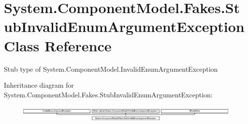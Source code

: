\hypertarget{class_system_1_1_component_model_1_1_fakes_1_1_stub_invalid_enum_argument_exception}{\section{System.\-Component\-Model.\-Fakes.\-Stub\-Invalid\-Enum\-Argument\-Exception Class Reference}
\label{class_system_1_1_component_model_1_1_fakes_1_1_stub_invalid_enum_argument_exception}
}


Stub type of System.\-Component\-Model.\-Invalid\-Enum\-Argument\-Exception 


Inheritance diagram for System.\-Component\-Model.\-Fakes.\-Stub\-Invalid\-Enum\-Argument\-Exception\-:\begin{figure}[H]
\begin{center}
\leavevmode
\includegraphics[height=0.862202cm]{class_system_1_1_component_model_1_1_fakes_1_1_stub_invalid_enum_argument_exception}
\end{center}
\end{figure}
